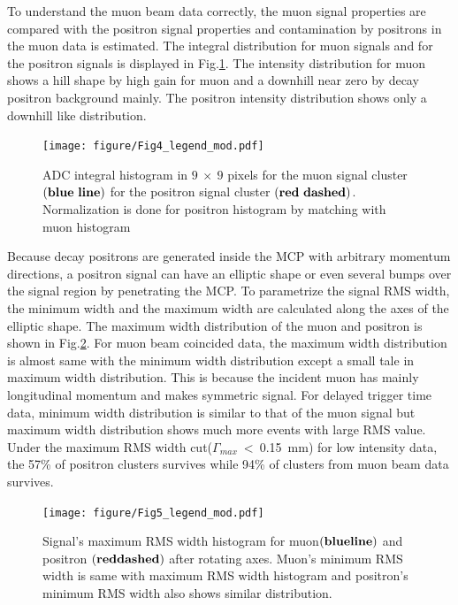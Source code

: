 \documentclass[preprint,3p,twocolumn]{elsarticle}
\begin{document}
To understand the muon beam data correctly, the muon signal properties are compared with the positron signal properties and contamination by positrons in the muon data is estimated. The integral distribution for muon signals and for the positron signals is displayed in Fig.\ref{fig:BPM_int}.
The intensity distribution for muon shows a hill shape by high gain for muon and a downhill near zero by decay positron background mainly.
The positron intensity distribution shows only a downhill like distribution.

\begin{figure}[htb]
\begin{minipage}[t]{60mm}
\texttt{[image: figure/Fig4\_legend\_mod.pdf]} %
\end{minipage}
\caption{ADC integral histogram in $9~\times~9$ pixels for the muon signal cluster $\bf (blue\ line)$ for the positron signal cluster $\bf (red\ dashed)$.
Normalization is done for positron histogram by matching with muon histogram}
\vspace{-0.2cm}
\label{fig:BPM_int}
\end{figure}

Because decay positrons are generated inside the MCP with arbitrary momentum directions, a positron signal can have an elliptic shape or even several bumps over the signal region by penetrating the MCP.
To parametrize the signal RMS width, the minimum width and the maximum width are calculated along the axes of the elliptic shape. %
The maximum width distribution of the muon and positron is shown in Fig.\ref{fig:positron_width}.
For muon beam coincided data, the maximum width distribution is almost same with the minimum width distribution except a small tale in maximum width distribution. This is because the incident muon has mainly longitudinal momentum and makes symmetric signal.
For delayed trigger time data, minimum width distribution is similar to that of the muon signal but maximum width distribution shows much more events with large RMS value. Under the maximum RMS width cut($\Gamma_{max}~<~$\SI{0.15}{mm}) for low intensity data, the 57\% of positron clusters survives while 94\% of clusters from muon beam data survives.

\begin{figure}[htb]
\begin{minipage}[t]{60mm}
\texttt{[image: figure/Fig5\_legend\_mod.pdf]}
\end{minipage}
\caption{Signal's maximum RMS width histogram for muon$\bf (blue line)$ and positron $\bf (red dashed)$ after rotating axes. 
Muon's minimum RMS width is same with maximum RMS width histogram and positron's minimum RMS width also shows similar distribution.}\vspace{-0.3cm}
\label{fig:positron_width}
\end{figure}
\end{document}
